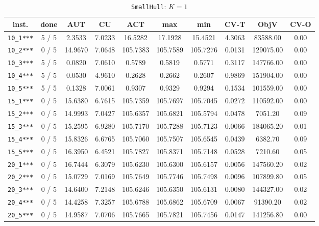 \begin{table}[h!]
\begin{center}
\small
\begin{tabular}{| c | c | c | c | c | c | c | c | c | c |}
\hline
inst. & done & AUT & CU & ACT & max & min & CV-T & ObjV & CV-O \\
\hline
\verb|10_1***| & 5 / 5 & 2.3533 & 7.0233 & 16.5282 & 17.1928 & 15.4521 & 4.3063 & 83588.00 & 0.00\\ 
\verb|10_2***| & 0 / 5 & 14.9670 & 7.0648 & 105.7383 & 105.7589 & 105.7276 & 0.0131 & 129075.00 & 0.00\\ 
\verb|10_3***| & 5 / 5 & 0.0820 & 7.0610 & 0.5789 & 0.5819 & 0.5771 & 0.3117 & 147766.00 & 0.00\\ 
\verb|10_4***| & 5 / 5 & 0.0530 & 4.9610 & 0.2628 & 0.2662 & 0.2607 & 0.9869 & 151904.00 & 0.00\\ 
\verb|10_5***| & 5 / 5 & 0.1328 & 7.0061 & 0.9307 & 0.9329 & 0.9294 & 0.1534 & 101559.00 & 0.00\\ 
\verb|15_1***| & 0 / 5 & 15.6380 & 6.7615 & 105.7359 & 105.7697 & 105.7045 & 0.0272 & 110592.00 & 0.00\\ 
\verb|15_2***| & 0 / 5 & 14.9993 & 7.0427 & 105.6357 & 105.6821 & 105.5794 & 0.0478 & 7051.20 & 0.09\\ 
\verb|15_3***| & 0 / 5 & 15.2595 & 6.9280 & 105.7170 & 105.7288 & 105.7123 & 0.0066 & 184065.20 & 0.01\\ 
\verb|15_4***| & 0 / 5 & 15.8326 & 6.6765 & 105.7060 & 105.7507 & 105.6545 & 0.0439 & 6382.70 & 0.09\\ 
\verb|15_5***| & 0 / 5 & 16.3950 & 6.4521 & 105.7827 & 105.8371 & 105.7148 & 0.0528 & 7210.60 & 0.05\\ 
\verb|20_1***| & 0 / 5 & 16.7444 & 6.3079 & 105.6230 & 105.6300 & 105.6157 & 0.0056 & 147560.20 & 0.02\\ 
\verb|20_2***| & 0 / 5 & 15.0729 & 7.0169 & 105.7649 & 105.7746 & 105.7498 & 0.0096 & 107899.80 & 0.05\\ 
\verb|20_3***| & 0 / 5 & 14.6400 & 7.2148 & 105.6246 & 105.6350 & 105.6131 & 0.0080 & 144327.00 & 0.02\\ 
\verb|20_4***| & 0 / 5 & 14.4258 & 7.3257 & 105.6788 & 105.6862 & 105.6709 & 0.0067 & 91390.20 & 0.02\\ 
\verb|20_5***| & 0 / 5 & 14.9587 & 7.0706 & 105.7665 & 105.7821 & 105.7456 & 0.0147 & 141256.80 & 0.00\\ 
\hline
\end{tabular}
\caption{\texttt{SmallHull}: $K = 1$}
\label{table:hull:1}
\end{center}
\end{table}

